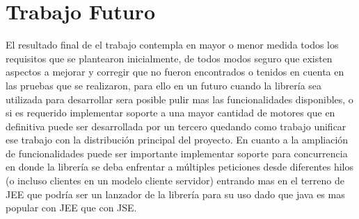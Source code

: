 \chapter*{Trabajo Futuro}
El resultado final de el trabajo contempla en mayor o menor medida todos los requisitos que se plantearon inicialmente, de todos modos seguro que existen aspectos a mejorar y corregir que no fueron encontrados o tenidos en cuenta en las pruebas que se realizaron, para ello en un futuro cuando la librería sea utilizada para desarrollar sera posible pulir mas las funcionalidades disponibles, o si es requerido implementar soporte a una mayor cantidad de motores que en definitiva puede ser desarrollada por un tercero quedando como trabajo unificar ese trabajo con la distribución principal del proyecto.
En cuanto a la ampliación de funcionalidades puede ser importante implementar soporte para concurrencia en donde la librería se deba enfrentar a múltiples peticiones desde diferentes hilos (o incluso clientes en un modelo cliente servidor) entrando mas en el terreno de JEE que podría ser un lanzador de la librería para su uso dado que java es mas popular con JEE que con JSE.
 